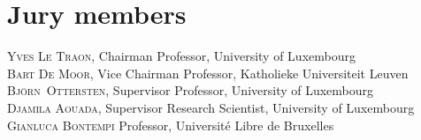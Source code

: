
\chapter*{Jury members}


\noindent \textsc{Yves Le Traon}, Chairman \newline
Professor, University of Luxembourg \\

\noindent \textsc{Bart De Moor}, Vice Chairman \newline
Professor, Katholieke Universiteit Leuven \\

\noindent \textsc{Bj\"orn~Ottersten}, Supervisor \newline
Professor, University of Luxembourg\\

\noindent \textsc{Djamila Aouada}, Supervisor \newline
Research Scientist, University of Luxembourg\\

\noindent \textsc{Gianluca Bontempi} \newline
Professor, Universit\'e Libre de Bruxelles\\

